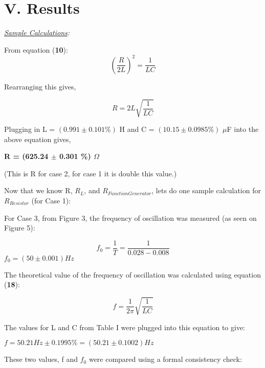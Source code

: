 \documentclass[twocolumn, letterpaper, 10pt, twoside]{article}
\begin{document}
\section*{V. Results}

\textit{\underline{Sample Calculations}:}

From equation (\textbf{10}): 
\begin{equation*}
(\frac{R}{2L})^2 = \frac{1}{LC}
\end{equation*}

Rearranging this gives, 

\begin{equation*}
R = 2L\sqrt{\frac{1}{LC}}
\end{equation*}

Plugging in L = $(0.991 \pm 0.101\%)$ H and C = $(10.15 \pm 0.0985\%)$ $\mu$F into the above equation gives, 

\textbf{R = (625.24 $\pm$ 0.301 \%) $\Omega$} 

(This is R for case 2, for case 1 it is double this value.)

Now that we know R, $R_L$, and $R_{Function Generator}$, lets do one sample calculation for $R_{Resistor}$ (for Case 1): 


For Case 3, from Figure 3, the frequency of oscillation was measured (as seen on Figure 5): 

\begin{equation*}
f_0 = \frac{1}{T} = \frac{1}{0.028 - 0.008}
\end{equation*}
$f_0 = (50 \pm 0.001)Hz$

The theoretical value of the frequency of oscillation was calculated using equation (\textbf{18}):

\begin{equation*}
f = \frac{1}{2\pi}\sqrt{\frac{1}{LC}}
\end{equation*} 

The values for L and C from Table I were plugged into this equation to give: 

$f = 50.21 Hz \pm 0.1995\% = (50.21 \pm 0.1002) Hz $

These two values, f and $f_0$ were compared using a formal consistency check: 
\end{document}
